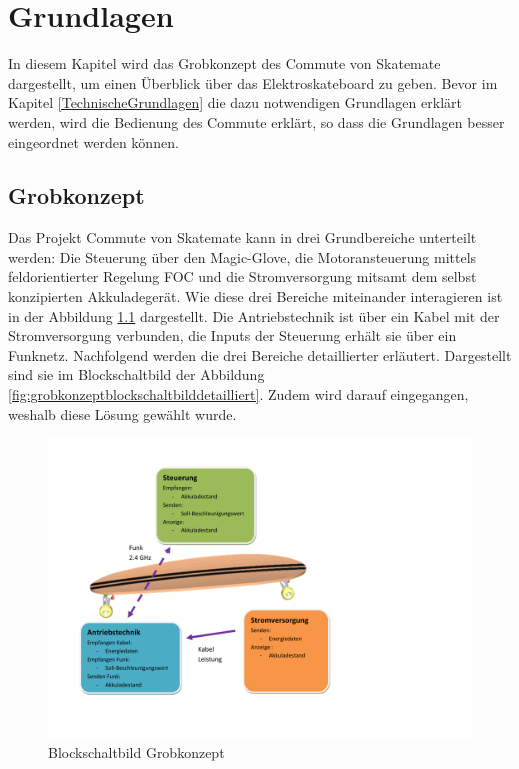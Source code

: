\chapter{Grundlagen}
\label{Grundlagen}
In diesem Kapitel wird das Grobkonzept des Commute von Skatemate dargestellt, um einen Überblick über das Elektroskateboard zu geben. Bevor im Kapitel \ref{TechnischeGrundlagen} die dazu notwendigen Grundlagen erklärt werden, wird die Bedienung des Commute erklärt, so dass die Grundlagen besser eingeordnet werden können. 
\section{Grobkonzept}
\label{Grobkonzept}
Das Projekt Commute von Skatemate kann in drei Grundbereiche unterteilt werden: Die Steuerung über den Magic-Glove, die Motoransteuerung mittels feldorientierter Regelung FOC und die Stromversorgung mitsamt dem selbst konzipierten Akkuladegerät. Wie diese drei Bereiche miteinander interagieren ist in der Abbildung \ref{fig:grobkonzeptblockschaltbildgrob} dargestellt. Die Antriebstechnik ist über ein Kabel mit der Stromversorgung verbunden, die Inputs der Steuerung erhält sie über ein Funknetz. Nachfolgend werden die drei Bereiche detaillierter erläutert. Dargestellt sind sie im Blockschaltbild der Abbildung \ref{fig:grobkonzeptblockschaltbilddetailliert}. Zudem wird darauf eingegangen, weshalb diese Lösung gewählt wurde. 
\begin{figure}[H]
	\centering
	\includegraphics[width=0.8\linewidth, keepaspectratio]{images/Grobkonzept_Blockschaltbild_grob}
	\caption[Blockschaltbild Grobkonzept]{Blockschaltbild Grobkonzept}
	\label{fig:grobkonzeptblockschaltbildgrob}
\end{figure}

